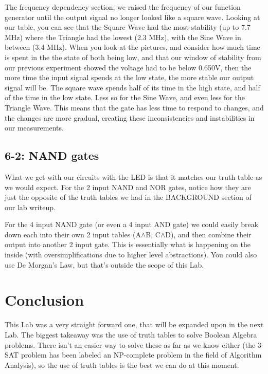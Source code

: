\documentclass[%
 aip,
 jmp,
 amsmath,
 amssymb,
 reprint,%
 numerical,
 longbibliography,
]{revtex4-1}
\begin{document}
	The frequency dependency section, we raised the frequency of our function generator
	until the output signal no longer looked like a square wave. Looking at our table, you can
	see that the Square Wave had the most stability (up to 7.7 MHz) where the Triangle had the
	lowest (2.3 MHz), with the Sine Wave in between (3.4 MHz). When you look at the pictures,
	and consider how much time is spent in the the state of both being low, and that our window
	of stability from our previous experiment showed the voltage had to be below 0.650V, then the
	more time the input signal spends at the low state, the more stable our output signal will be.
	The square wave spends half of its time in the high state, and half of the time in the low state.
	Less so for the Sine Wave, and even less for the Triangle Wave. This means that the gate has
	less time to respond to changes, and the changes are more gradual, creating these inconsistencies
	and instabilities in our measurements.
	
	\subsection{6-2: NAND gates}
	
	What we get with our circuits with the LED is that it matches our truth table
	as we would expect. For the 2 input NAND and NOR gates, notice how they are just
	the opposite of the truth tables we had in the BACKGROUND section of our lab writeup.
	
	For the 4 input NAND gate (or even a 4 input AND gate) we could easily break down each
	into their own 2 input tables (A$\land$B, C$\land$D), and then combine their output
	into another 2 input gate. This is essentially what is happening on the inside
	(with oversimplifications due to higher level abstractions). You could also use
	De Morgan's Law, but that's outside the scope of this Lab.

\section{Conclusion}

This Lab was a very straight forward one, that will be expanded upon in the next Lab.
The biggest takeaway was the use of truth tables to solve Boolean Algebra problems.
There isn't an easier way to solve these as far as we know either (the 3-SAT problem
has been labeled an NP-complete problem in the field of Algorithm Analysis), so the
use of truth tables is the best we can do at this moment.
\end{document}
